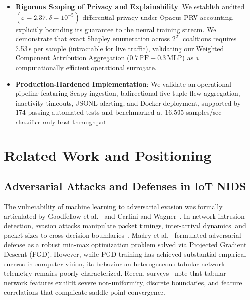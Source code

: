 \documentclass[10pt,journal,compsoc,twocolumn]{IEEEtran}
\begin{document}
\begin{itemize}
    \item \textbf{Rigorous Scoping of Privacy and Explainability}: We establish audited $(\varepsilon=2.37, \delta=10^{-5})$ differential privacy under Opacus PRV accounting, explicitly bounding its guarantee to the neural training stream. We demonstrate that exact Shapley enumeration across $2^{21}$ coalitions requires 3.53\,s per sample (intractable for live traffic), validating our Weighted Component Attribution Aggregation ($0.7\,\text{RF} + 0.3\,\text{MLP}$) as a computationally efficient operational surrogate.
    \item \textbf{Production-Hardened Implementation}: We validate an operational pipeline featuring Scapy ingestion, bidirectional five-tuple flow aggregation, inactivity timeouts, JSONL alerting, and Docker deployment, supported by 174 passing automated tests and benchmarked at 16,505 samples/sec classifier-only host throughput.
\end{itemize}

\section{Related Work and Positioning}
\subsection{Adversarial Attacks and Defenses in IoT NIDS}
The vulnerability of machine learning to adversarial evasion was formally articulated by Goodfellow et al.~\cite{goodfellow2015explaining} and Carlini and Wagner~\cite{carlini2017towards}. In network intrusion detection, evasion attacks manipulate packet timings, inter-arrival dynamics, and packet sizes to cross decision boundaries~\cite{alshahrani2021adversarial, khazane2024holistic}. Madry et al.~\cite{madry2018towards} formulated adversarial defense as a robust min-max optimization problem solved via Projected Gradient Descent (PGD). However, while PGD training has achieved substantial empirical success in computer vision, its behavior on heterogeneous tabular network telemetry remains poorly characterized. Recent surveys~\cite{harbi2024roadmap, ma2025backdoor} note that tabular network features exhibit severe non-uniformity, discrete boundaries, and feature correlations that complicate saddle-point convergence.
\end{document}
